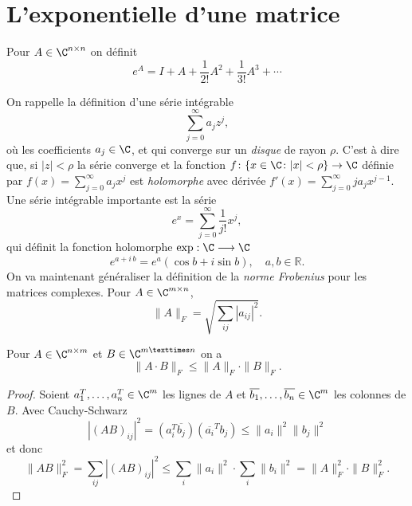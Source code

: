 \section{L'exponentielle d'une matrice}
\label{sec:lexp-dune-matr}


\begin{definition}
  \label{def:28}
  Pour $A \in \C^{n \times n}$ on définit 
  \begin{displaymath}
    e^A = I + A + \frac{1}{2!} A^2 + \frac{1}{3!}A^3 + \cdots 
  \end{displaymath}
\end{definition}

\noindent On rappelle la définition d'une série intégrable 
\begin{displaymath}
  \sum_{j=0}^\infty a_j z^j,
\end{displaymath}
où les coefficients $a_j \in\C$, et
qui converge sur un \emph{disque} de rayon $\rho$. C'est à dire que, si $|z|< \rho$ la série converge et la fonction $f\colon \{x \in \C \colon |x| < \rho \}  \rightarrow \C$ définie par $f(x) = \sum_{j=0}^\infty a_j x^j $ est \emph{holomorphe} avec dérivée $f'(x) =  \sum_{j=0}^\infty j a_j x^{j-1}$. 
Une série intégrable importante est la série
\begin{displaymath}
  e^{x} = \sum_{j=0}^\infty \frac{1}{j!} x^j,
\end{displaymath}
qui définit la fonction holomorphe $\exp: \C \longrightarrow \C$ 
\begin{displaymath}
  e^{a+i\,b} = e^a (\cos b + i \sin b), \quad   a,b ∈ ℝ. 
\end{displaymath}
%
\noindent On va maintenant généraliser la définition de la \emph{norme Frobenius} pour les matrices complexes. Pour $A \in \C^{m\times n}$, 
\begin{displaymath}
  \|A\|_F = \sqrt{\sum_{ij} |a_{ij}|^2 }. 
\end{displaymath}

\begin{lemma}
  \label{lem:16}
  Pour $A \in \C^{n \times m}$ et $B \in \C^{m × n}$  on a 
  \begin{displaymath}
    \|A\cdot B\|_F \leq \|A\|_F\cdot \|B\|_F. 
  \end{displaymath}
\end{lemma}

  \begin{proof}Soient $a_1^T,\dots,a_n^T \in \C^m$ les lignes de $A$ et $\overline{b_1},\dots,\overline{b_n} \in \C^m$ les colonnes de $B$. Avec Cauchy-Schwarz 
    \begin{displaymath}
          |(AB)_{ij}|^2 = (a_i^T \overline{b_j})(\overline{a_i}^T b_j)  \leq \|a_i\|^2 \|b_j\|^2
    \end{displaymath}
et donc 
\begin{displaymath}
  \|AB\|_F^2 = \sum_{ij} |(AB)_{ij}|^2 \leq \sum_i\|a_i\|^2 \cdot \sum_i \|b_i\|^2 = \|A\|_F^2 \cdot \|B\|_F^2. 
\end{displaymath}
  \end{proof}


